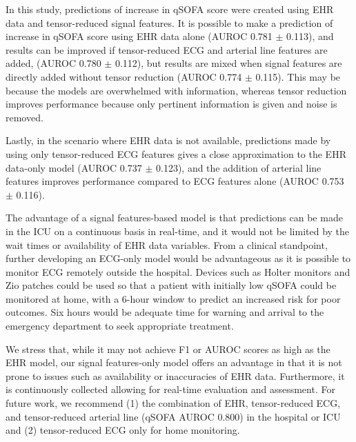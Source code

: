 
In this study, predictions of increase in qSOFA score were created using EHR data and tensor-reduced signal features. It is possible to make a prediction of increase in qSOFA score using EHR data alone (AUROC 0.781 $\pm$ 0.113), and results can be improved if tensor-reduced ECG and arterial line features are added, (AUROC 0.780 $\pm$ 0.112), but results are mixed when signal features are directly added without tensor reduction (AUROC 0.774 $\pm$ 0.115). This may be because the models are overwhelmed with information, whereas tensor reduction improves performance because only pertinent information is given and noise is removed.

Lastly, in the scenario where EHR data is not available, predictions made by using only tensor-reduced ECG features gives a close approximation to the EHR data-only model (AUROC 0.737 $\pm$ 0.123), and the addition of arterial line features improves performance compared to ECG features alone (AUROC 0.753 $\pm$ 0.116). 

The advantage of a signal features-based model is that predictions can be made in the ICU on a continuous basis in real-time, and it would not be limited by the wait times or availability of EHR data variables. From a clinical standpoint, further developing an ECG-only model would be advantageous as it is possible to monitor ECG remotely outside the hospital. Devices such as Holter monitors and Zio patches could be used so that a patient with initially low qSOFA could be monitored at home, with a 6-hour window to predict an increased risk for poor outcomes. Six hours would be adequate time for warning and arrival to the emergency department to seek appropriate treatment.

We stress that, while it may not achieve F1 or AUROC scores as high as the EHR model, our signal features-only model offers an advantage in that it is not prone to issues such as availability or inaccuracies of EHR data. Furthermore, it is continuously collected allowing for real-time evaluation and assessment. For future work, we recommend (1) the combination of EHR, tensor-reduced ECG, and tensor-reduced arterial line (qSOFA AUROC 0.800) in the hospital or ICU and (2) tensor-reduced  ECG only for home monitoring.
